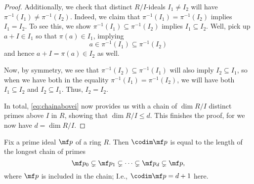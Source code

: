 \begin{proof}
	Additionally, we check that distinct $R/I$-ideals $I_1\ne I_2$ will have $\pi^{-1}(I_1)\ne\pi^{-1}(I_2)$. Indeed, we claim that $\pi^{-1}(I_1)=\pi^{-1}(I_2)$ implies $I_1=I_2$. To see this, we show $\pi^{-1}(I_1)\subseteq\pi^{-1}(I_2)$ implies $I_1\subseteq I_2$. Well, pick up $a+I\in I_1$ so that $\pi(a)\in I_1$, implying
	\[a\in\pi^{-1}(I_1)\subseteq\pi^{-1}(I_2)\]
	and hence $a+I=\pi(a)\in I_2$ as well.
	
	Now, by symmetry, we see that $\pi^{-1}(I_2)\subseteq\pi^{-1}(I_1)$ will also imply $I_2\subseteq I_1$, so when we have both in the equality $\pi^{-1}(I_1)=\pi^{-1}(I_2)$, we will have both $I_1\subseteq I_2$ and $I_2\subseteq I_1$. Thus, $I_2=I_2$.

	In total, \autoref{eq:chainabovei} now provides us with a chain of $\dim R/I$ distinct primes above $I$ in $R$, showing that $\dim R/I\le d$. This finishes the proof, for we now have $d=\dim R/I$.
\end{proof}
\begin{lemma} \label{lem:codimisdescend}
	Fix a prime ideal $\mf p$ of a ring $R$. Then $\codim\mf p$ is equal to the length of the longest chain of primes
	\[\mf p_0\subsetneq\mf p_1\subsetneq\cdots\subsetneq\mf p_d\subsetneq\mf p,\]
	where $\mf p$ is included in the chain; I.e., $\codim\mf p=d+1$ here.
\end{lemma}
